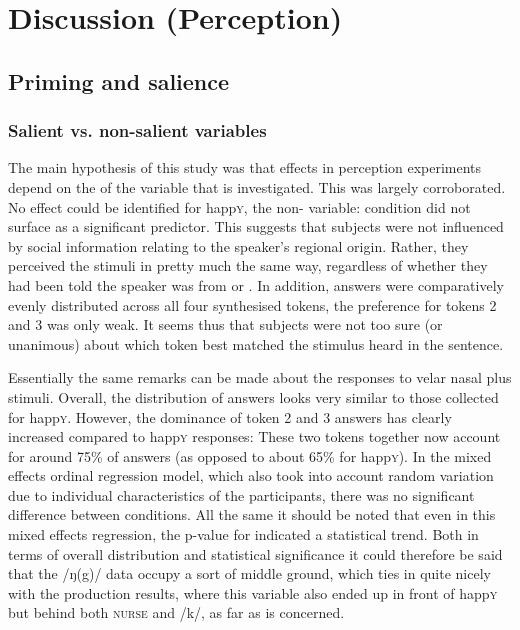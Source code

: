 	\chapter{Discussion (Perception)}
	\label{ch.perc_disc}

	\section{Priming and salience}
		\label{sec.perc_res.disc.salience}

		\subsection{Salient vs. non-salient variables}
		
The main hypothesis of this study was that  effects in perception experiments depend on the  of the variable that is investigated.
This was largely corroborated.
No  effect could be identified for happ\textsc{y}, the non-  variable:  condition did not surface as a significant predictor.
This suggests that subjects were not influenced by social information relating to the speaker's regional origin.
Rather, they perceived the stimuli in pretty much the same way, regardless of whether they had been told the speaker was from  or .
In addition, answers were comparatively evenly distributed across all four synthesised tokens, the preference for tokens 2 and 3 was only weak.
It seems thus that subjects were not too sure (or unanimous) about which token best matched the stimulus heard in the sentence.

Essentially the same remarks can be made about the responses to velar nasal plus stimuli.
Overall, the distribution of answers looks very similar to those collected for happ\textsc{y}.
However, the dominance of token 2 and 3 answers has clearly increased compared to happ\textsc{y} responses: These two tokens together now account for around 75\% of answers (as opposed to about 65\% for happ\textsc{y}).
In the mixed effects ordinal regression model, which also took into account random variation due to individual characteristics of the participants, there was no significant difference between  conditions.
All the same it should be noted that even in this mixed effects regression, the p-value for  indicated a statistical trend.
Both in terms of overall distribution and statistical significance it could therefore be said that the /ŋ(g)/ data occupy a sort of middle ground, which ties in quite nicely with the production results, where this variable also ended up in front of happ\textsc{y} but behind both \textsc{nurse} and /k/, as far as  is concerned.

